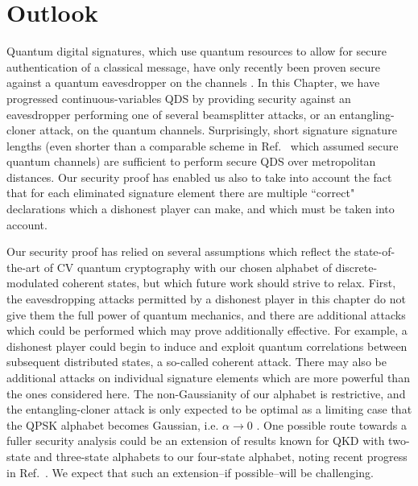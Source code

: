 \clearpage
\section{Outlook}
Quantum digital signatures, which use quantum resources to allow for secure authentication of a classical message, have only recently been proven secure against a quantum eavesdropper on the channels \cite{Amiri2016, Puthoor2016, Yin2016}. In this Chapter, we have progressed continuous-variables QDS by providing security against an eavesdropper performing one of several beamsplitter attacks, or an entangling-cloner attack, on the quantum channels. Surprisingly, short signature signature lengths (even shorter than a comparable scheme in Ref.~\cite{Croal2016} which assumed secure quantum channels) are sufficient to perform secure QDS over metropolitan distances. Our security proof has enabled us also to take into account the fact that for each eliminated signature element there are multiple ``correct" declarations which a dishonest player can make, and which must be taken into account.

Our security proof has relied on several assumptions which reflect the state-of-the-art of CV quantum cryptography with our chosen alphabet of discrete-modulated coherent states, but which future work should strive to relax. First, the eavesdropping attacks permitted by a dishonest player in this chapter do not give them the full power of quantum mechanics, and there are additional attacks which could be performed which may prove additionally effective. For example, a dishonest player could begin to induce and exploit quantum correlations between subsequent distributed states, a so-called coherent attack. There may also be additional attacks on individual signature elements which are more powerful than the ones considered here. The non-Gaussianity of our alphabet is restrictive, and the entangling-cloner attack is only expected to be optimal as a limiting case that the QPSK alphabet becomes Gaussian, i.e. $\alpha \rightarrow 0$ \cite{Navascues2006, Garcia-Patron2006}. One possible route towards a fuller security analysis could be an extension of results known for QKD with two-state \cite{Zhao2009} and three-state \cite{Bradler2018} alphabets to our four-state alphabet, noting recent progress in Ref.~\cite{Papanastasiou2018}. We expect that such an extension--if possible--will be challenging.

